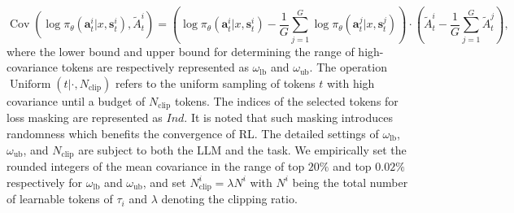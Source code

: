 \documentclass[]{youtu} %
\begin{document}
\begin{equation}\label{eq:covariance}
\operatorname{Cov}(\log\pi_{\theta}(\mathbf{a}_t^{i}|x,\mathbf{s}_t^{i}), \tilde{A}_{t}^{i})=(\log\pi_\theta(\mathbf{a}_t^{i}|x,\mathbf{s}_t^{i})-\frac{1}{G}\sum_{j=1}^{G}\log\pi_\theta(\mathbf{a}_t^{j}|x,\mathbf{s}_t^{j}))\cdot(\tilde{A}_{t}^{i}-\frac{1}{G}\sum_{j=1}^{G}\tilde{A}_{t}^{j}),
\end{equation}
\noindent where the lower bound and upper bound for determining the range of high-covariance tokens are respectively represented as $\omega_{\text{lb}}$ and $\omega_{\text{ub}}$.
The operation $\operatorname{Uniform}(t|\cdot, N_{\text{clip}})$ refers to the uniform sampling of tokens $t$ with high covariance until a budget of $N_{\text{clip}}$ tokens.
The indices of the selected tokens for loss masking are represented as $Ind$.
It is noted that such masking introduces randomness which benefits the convergence of RL.
The detailed settings of $\omega_{\text{lb}}$, $\omega_{\text{ub}}$, and $N_{\text{clip}}$ are subject to both the LLM and the task.
We empirically set the rounded integers of the mean covariance in the range of top $20\%$ and top $0.02\%$ respectively for $\omega_{\text{lb}}$ and $\omega_{\text{ub}}$,
and set $N^{i}_{\text{clip}}=\lambda N^{i}$ with $N^{i}$ being the total number of learnable tokens of $\tau_i$ and $\lambda$ denoting the clipping ratio.
\end{document}

